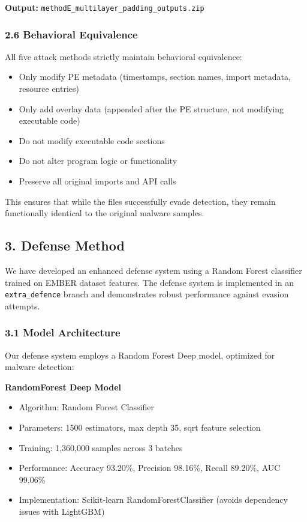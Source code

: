 \documentclass[12pt,letterpaper]{article}
\begin{document}
\textbf{Output:} \texttt{methodE\_multilayer\_padding\_outputs.zip}

\subsubsection*{2.6 Behavioral Equivalence}

All five attack methods strictly maintain behavioral equivalence:
\begin{itemize}
    \item Only modify PE metadata (timestamps, section names, import metadata, resource entries)
    \item Only add overlay data (appended after the PE structure, not modifying executable code)
    \item Do not modify executable code sections
    \item Do not alter program logic or functionality
    \item Preserve all original imports and API calls
\end{itemize}

This ensures that while the files successfully evade detection, they remain functionally identical to the original malware samples.

\subsection*{3. Defense Method}

We have developed an enhanced defense system using a Random Forest classifier trained on EMBER dataset features. The defense system is implemented in an \texttt{extra\_defence} branch and demonstrates robust performance against evasion attempts.

\subsubsection*{3.1 Model Architecture}

Our defense system employs a Random Forest Deep model, optimized for malware detection:

\textbf{RandomForest Deep Model}
\begin{itemize}
    \item Algorithm: Random Forest Classifier
    \item Parameters: 1500 estimators, max depth 35, sqrt feature selection
    \item Training: 1,360,000 samples across 3 batches
    \item Performance: Accuracy 93.20\%, Precision 98.16\%, Recall 89.20\%, AUC 99.06\%
    \item Implementation: Scikit-learn RandomForestClassifier (avoids dependency issues with LightGBM)
\end{itemize}
\end{document}
